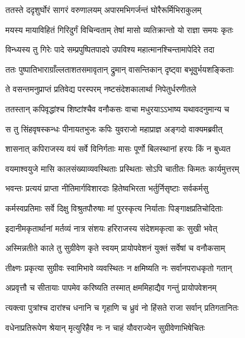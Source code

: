 
\twolineshloka
{ततस्ते ददृशुर्घोरं सागरं वरुणालयम्}
{अपारमभिगर्जन्तं घोरैरूर्मिभिराकुलम्} %

\twolineshloka
{मयस्य मायाविहितं गिरिदुर्गं विचिन्वताम्}
{तेषां मासो व्यतिक्रान्तो यो राज्ञा समयः कृतः} %

\twolineshloka
{विन्ध्यस्य तु गिरेः पादे सम्प्रपुष्पितपादपे}
{उपविश्य महात्मानश्चिन्तामापेदिरे तदा} %

\twolineshloka
{ततः पुष्पातिभाराग्राँल्लताशतसमावृतान्}
{द्रुमान् वासन्तिकान् दृष्ट्वा बभूवुर्भयशङ्किताः} %

\twolineshloka
{ते वसन्तमनुप्राप्तं प्रतिवेद्य परस्परम्}
{नष्टसंदेशकालार्था निपेतुर्धरणीतले} %

\twolineshloka
{ततस्तान् कपिवृद्धांश्च शिष्टांश्चैव वनौकसः}
{वाचा मधुरयाऽऽभाष्य यथावदनुमान्य च} %

\twolineshloka
{स तु सिंहवृषस्कन्धः पीनायतभुजः कपिः}
{युवराजो महाप्राज्ञ अङ्गदो वाक्यमब्रवीत्} %

\twolineshloka
{शासनात् कपिराजस्य वयं सर्वे विनिर्गताः}
{मासः पूर्णो बिलस्थानां हरयः किं न बुध्यत} %

\twolineshloka
{वयमाश्वयुजे मासि कालसंख्याव्यवस्थिताः}
{प्रस्थिताः सोऽपि चातीतः किमतः कार्यमुत्तरम्} %

\twolineshloka
{भवन्तः प्रत्ययं प्राप्ता नीतिमार्गविशारदाः}
{हितेष्वभिरता भर्तुर्निसृष्टाः सर्वकर्मसु} %

\twolineshloka
{कर्मस्वप्रतिमाः सर्वे दिक्षु विश्रुतपौरुषाः}
{मां पुरस्कृत्य निर्याताः पिङ्गाक्षप्रतिचोदिताः} %

\twolineshloka
{इदानीमकृतार्थानां मर्तव्यं नात्र संशयः}
{हरिराजस्य संदेशमकृत्वा कः सुखी भवेत्} %

\twolineshloka
{अस्मिन्नतीते काले तु सुग्रीवेण कृते स्वयम्}
{प्रायोपवेशनं युक्तं सर्वेषां च वनौकसाम्} %

\twolineshloka
{तीक्ष्णः प्रकृत्या सुग्रीवः स्वामिभावे व्यवस्थितः}
{न क्षमिष्यति नः सर्वानपराधकृतो गतान्} %

\twolineshloka
{अप्रवृत्तौ च सीतायाः पापमेव करिष्यति}
{तस्मात् क्षममिहाद्यैव गन्तुं प्रायोपवेशनम्} %

\twolineshloka
{त्यक्त्वा पुत्रांश्च दारांश्च धनानि च गृहाणि च}
{ध्रुवं नो हिंसते राजा सर्वान् प्रतिगतानितः} %

\twolineshloka
{वधेनाप्रतिरूपेण श्रेयान् मृत्युरिहैव नः}
{न चाहं यौवराज्येन सुग्रीवेणाभिषेचितः} %

